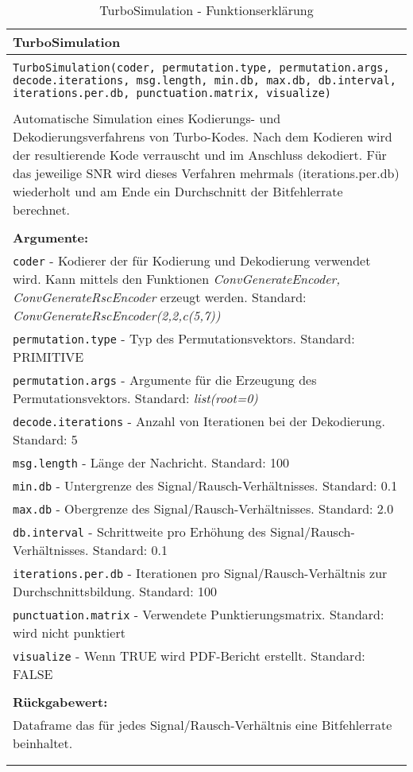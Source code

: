 \begin{longtable}{|p{\textwidth}|}
\hline
\rowcolor{lightblue}TurboSimulation\\
\hline
\\
\texttt{TurboSimulation(coder, permutation.type, permutation.args, decode.iterations, msg.length, min.db, max.db, db.interval, iterations.per.db, punctuation.matrix, visualize)}\\
\\
Automatische Simulation eines Kodierungs- und Dekodierungsverfahrens von Turbo-Kodes. Nach dem Kodieren wird der resultierende Kode verrauscht und im Anschluss dekodiert. Für das jeweilige SNR wird dieses Verfahren mehrmals (iterations.per.db) wiederholt und am Ende ein Durchschnitt der Bitfehlerrate berechnet.\\
\\
\textbf{Argumente:}\\
\texttt{coder} - Kodierer der für Kodierung und Dekodierung verwendet wird. Kann mittels den Funktionen \emph{ConvGenerateEncoder, ConvGenerateRscEncoder} erzeugt werden. Standard: \emph{ConvGenerateRscEncoder(2,2,c(5,7))}\\
\texttt{permutation.type} - Typ des Permutationsvektors. Standard: PRIMITIVE\\
\texttt{permutation.args} - Argumente für die Erzeugung des Permutationsvektors. Standard: \emph{list(root=0)}\\
\texttt{decode.iterations} - Anzahl von Iterationen bei der Dekodierung. Standard: 5\\
\texttt{msg.length} - Länge der Nachricht. Standard: 100\\
\texttt{min.db} - Untergrenze des Signal/Rausch-Verhältnisses. Standard: 0.1\\
\texttt{max.db} - Obergrenze des Signal/Rausch-Verhältnisses. Standard: 2.0\\
\texttt{db.interval} - Schrittweite pro Erhöhung des Signal/Rausch-Verhältnisses. Standard: 0.1\\
\texttt{iterations.per.db} - Iterationen pro Signal/Rausch-Verhältnis zur Durchschnittsbildung. Standard: 100\\
\texttt{punctuation.matrix} - Verwendete Punktierungsmatrix. Standard: wird nicht punktiert\\
\texttt{visualize} - Wenn TRUE wird PDF-Bericht erstellt. Standard: FALSE\\
\\
\textbf{Rückgabewert:}\\
Dataframe das für jedes Signal/Rausch-Verhältnis eine Bitfehlerrate beinhaltet.\\
\\
\hline
\caption[TurboSimulation]{TurboSimulation - Funktionserklärung}
\end{longtable}